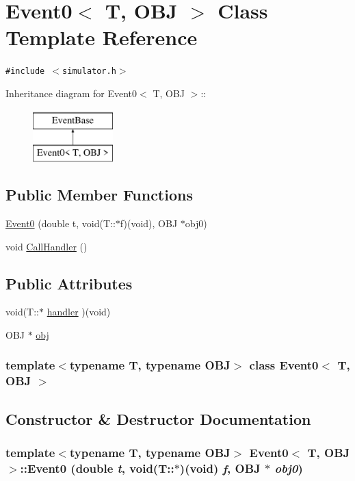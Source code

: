 \hypertarget{classEvent0}{
\section{Event0$<$ T, OBJ $>$ Class Template Reference}
\label{classEvent0}
}
{\tt \#include $<$simulator.h$>$}

Inheritance diagram for Event0$<$ T, OBJ $>$::\begin{figure}[H]
\begin{center}
\leavevmode
\includegraphics[height=2cm]{classEvent0}
\end{center}
\end{figure}
\subsection*{Public Member Functions}
\begin{CompactItemize}
\item 
\hyperlink{classEvent0_c3286a88ee0681958c96062c5325b48e}{Event0} (double t, void(T::$\ast$f)(void), OBJ $\ast$obj0)
\item 
void \hyperlink{classEvent0_77176d1040ed4cc48fa750c4854212b9}{CallHandler} ()
\end{CompactItemize}
\subsection*{Public Attributes}
\begin{CompactItemize}
\item 
void(T::$\ast$ \hyperlink{classEvent0_9f5c4b04f0f887ef7a2df146e10e9403}{handler} )(void)
\item 
OBJ $\ast$ \hyperlink{classEvent0_b37236e93d14993e36a8913ae2dbaf31}{obj}
\end{CompactItemize}
\subsubsection*{template$<$typename T, typename OBJ$>$ class Event0$<$ T, OBJ $>$}



\subsection{Constructor \& Destructor Documentation}
\hypertarget{classEvent0_c3286a88ee0681958c96062c5325b48e}{
\subsubsection[{Event0}]{\setlength{\rightskip}{0pt plus 5cm}template$<$typename T, typename OBJ$>$ {\bf Event0}$<$ T, OBJ $>$::{\bf Event0} (double {\em t}, \/  void(T::$\ast$)(void) {\em f}, \/  OBJ $\ast$ {\em obj0})}}
\label{classEvent0_c3286a88ee0681958c96062c5325b48e}




